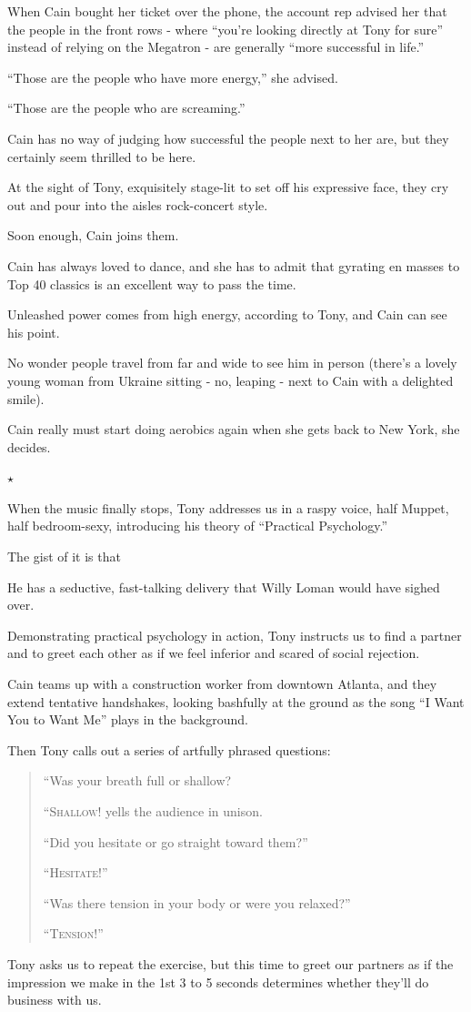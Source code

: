\documentclass[oneside]{article}
\numberwithin{equation}{section}
\begin{document}
When Cain bought her ticket over the phone, the account rep advised her that the people in the front rows - where ``you're looking directly at Tony for sure'' instead of relying on the Megatron - are generally ``more successful in life.''

``Those are the people who have more energy,'' she advised.

``Those are the people who are screaming.''

Cain has no way of judging how successful the people next to her are, but they certainly seem thrilled to be here.

At the sight of Tony, exquisitely stage-lit to set off his expressive face, they cry out and pour into the aisles rock-concert style.

%
Soon enough, Cain joins them.

Cain has always loved to dance, and she has to admit that gyrating en masses to Top 40 classics is an excellent way to pass the time.

Unleashed power comes from high energy, according to Tony, and Cain can see his point.

No wonder people travel from far and wide to see him in person (there's a lovely young woman from Ukraine sitting - no, leaping - next to Cain with a delighted smile).

Cain really must start doing aerobics again when she gets back to New York, she decides.
\begin{center}
    $\star$
\end{center}
When the music finally stops, Tony addresses us in a raspy voice, half Muppet, half bedroom-sexy, introducing his theory of ``Practical Psychology.''

The gist of it is that 

He has a seductive, fast-talking delivery that Willy Loman would have sighed over.

Demonstrating practical psychology in action, Tony instructs us to find a partner and to greet each other as if we feel inferior and scared of social rejection.

Cain teams up with a construction worker from downtown Atlanta, and they extend tentative handshakes, looking bashfully at the ground as the song ``I Want You to Want Me'' plays in the background.

%
Then Tony calls out a series of artfully phrased questions:
\begin{quotation}
    ``Was your breath full or shallow?
    
    ``\textsc{Shallow}! yells the audience in unison.
    
    ``Did you hesitate or go straight toward them?''
    
    ``\textsc{Hesitate!}''
    
    ``Was there tension in your body or were you relaxed?''
    
    ``\textsc{Tension!}''
\end{quotation}
%
Tony asks us to repeat the exercise, but this time to greet our partners as if the impression we make in the 1st 3 to 5 seconds determines whether they'll do business with us.
\end{document}
